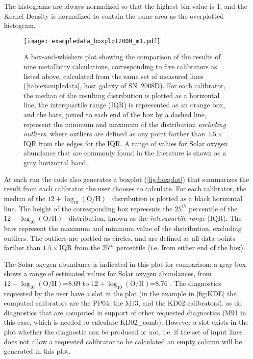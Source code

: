 \documentclass{emulateapj}
\newcommand{\oxabinline}{\ensuremath{12 + \log_{10}(\mathrm{O}/\mathrm{H})}}
\begin{document}
The histograms are always normalized so that the highest bin value is
1, and the Kernel Density is normalized to contain the same area as the
overplotted histogram.


\begin{figure}[ht!]
  \texttt{[image: exampledata\_boxplot2000\_m1.pdf]}
   \caption{A box-and-whiskers plot showing the comparison of the
     results of nine metallicity calculations, corresponding to five
     calibrators as listed above, calculated from the same set of
     measured lines (\autoref{tab:exampledata}, host galaxy of
     SN~2008D). For each calibrator, the median of the resulting
     distribution is plotted as a horizontal line, the interquartile
     range (IQR) is represented as an orange box, and the bars, joined
     to each end of the box by a dashed line, represent the minimum
     and maximum of the distribution \emph{excluding outliers}, where
     outliers are defined as any point farther than $1.5\times$ IQR
     from the edges for the IQR. A range of values for Solar oxygen
     abundance that are commonly found in the literature is shown as
     a gray horizontal band.}
 \label{fig:boxplot}
\end{figure}

At each run the code also generates a boxplot (\autoref{fig:boxplot})
that summarizes the result from each calibrator the user chooses to
calculate. For each calibrator, the median of the \oxabinline~
distribution is plotted as a black horizontal line. The height of the
corresponding box represents the $25^{th}$ percentile of the
\oxabinline~ distribution, known as the \emph{interquartile range}
(IQR).  The bars represent the maximum and minimum value of the
distribution, excluding outliers. The outliers are plotted as circles,
and are defined as all data points farther than
$1.5\times\mathrm{IQR}$ from the $25^{th}$ percentile (i.e. from
either end of the box).

The Solar oxygen abundance is indicated in this plot for comparison: a
gray box shows a range of estimated values for Solar oxygen
abundances, from \oxabinline=8.69 \citep{asplund09rev} to
\oxabinline=8.76 \citep{chaffau11}.  The diagnostics requested by the
user have a slot in the plot (in the example in \autoref{fig:KDE}
the computed calibrators are the PP04, the M13, and the KD02
calibrators), as do diagnostics that are computed in support of other
requested diagnostics (M91 in this case, which is needed to calculate
KD02\_comb). However a slot exists in the plot whether the diagnostic
can be produced or not, i.e. if the set of input lines does not allow
a requested calibrator to be calculated an empty column will be
generated in this plot.
\end{document}

